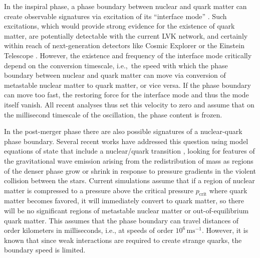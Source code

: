 \documentclass[10pt,superscriptaddress,
amsmath,aps,prc,twocolumn,nofootinbib,floatfix]{revtex4-1}
\newcommand{\mga}[1]{{\color[rgb]{0.8,0,0}#1}}
\newcommand{\mgacom}[1]{\textsf{\color[rgb]{0.7,0,0}[\textsuperscript{MGA} #1]}}
\newcommand{\AH}[1]{{\color{cyan}#1}}
\newcommand{\m}{\text{m}}
\newcommand{\s}{\text{s}}
\begin{document}
\AH{In the inspiral phase, \mga{a phase boundary between nuclear and quark matter
can create observable signatures via excitation of its ``interface mode'' \cite{Counsell:2025hcv,Pereira:2025xsi}.
Such excitations,}
which would provide strong evidence for the existence of quark matter, are potentially detectable with the current LVK network, and certainly within reach of next-generation detectors like Cosmic Explorer or the Einstein Telescope \cite{Counsell:2025hcv,Pereira:2025xsi}. However, the existence and frequency of the interface mode critically depend on the conversion timescale, i.e.,~the speed with which the phase boundary between nuclear and quark matter can move \mga{via conversion of metastable nuclear matter to quark matter, or vice versa}. If the phase boundary can move too fast, the restoring force for the interface mode and thus the mode itself vanish. All recent analyses %
\cite{Tonetto:2020bie,Counsell:2025hcv,Pereira:2025xsi} thus set this velocity to zero and assume that on the millisecond timescale of the oscillation, the phase content is frozen.}

\mga{In the post-merger phase there are also possible signatures of
a nuclear-quark phase boundary.}
Several recent works have addressed this question using model equations of state that include a nuclear/quark transition \cite{Most:2018eaw,Bauswein:2018bma,Espino:2023llj,Weih:2019xvw,Harada:2023eyg,Bauswein:2020ggy,Haque:2022dsc,Fujimoto:2022xhv,Christian:2023hez,Fujimoto:2024ymt},
\mga{looking for features of the gravitational wave emission arising}
from the redistribution of mass
as regions of the denser phase grow or shrink in response to pressure gradients in the violent collision between the stars. 
Current simulations assume that if a region of nuclear matter is compressed to a pressure above the critical pressure $p_\text{crit}$ where quark matter becomes favored, it will immediately convert to quark matter,
so there will be no significant regions of metastable nuclear matter
\mga{or out-of-equilibrium quark matter}. This assumes that the phase boundary can travel distances of order kilometers in milliseconds, i.e., at speeds of order $10^6\,\m\s^{-1}$. However, it is known that since weak interactions are required to create strange quarks, the boundary speed is limited.
\end{document}
